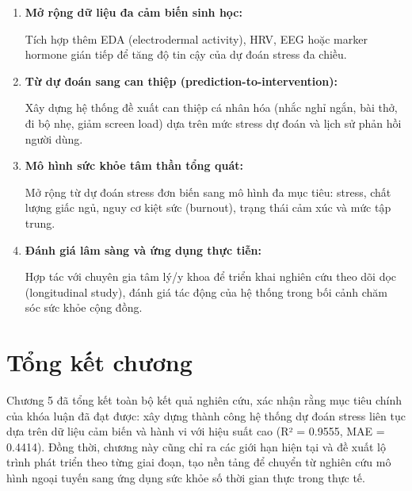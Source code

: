 \begin{enumerate}
    \item \textbf{Mở rộng dữ liệu đa cảm biến sinh học:}
    
    Tích hợp thêm EDA (electrodermal activity), HRV, EEG hoặc marker hormone gián tiếp để tăng độ tin cậy của dự đoán stress đa chiều.

    \item \textbf{Từ dự đoán sang can thiệp (prediction-to-intervention):}
    
    Xây dựng hệ thống đề xuất can thiệp cá nhân hóa (nhắc nghỉ ngắn, bài thở, đi bộ nhẹ, giảm screen load) dựa trên mức stress dự đoán và lịch sử phản hồi người dùng.

    \item \textbf{Mô hình sức khỏe tâm thần tổng quát:}
    
    Mở rộng từ dự đoán stress đơn biến sang mô hình đa mục tiêu: stress, chất lượng giấc ngủ, nguy cơ kiệt sức (burnout), trạng thái cảm xúc và mức tập trung.

    \item \textbf{Đánh giá lâm sàng và ứng dụng thực tiễn:}
    
    Hợp tác với chuyên gia tâm lý/y khoa để triển khai nghiên cứu theo dõi dọc (longitudinal study), đánh giá tác động của hệ thống trong bối cảnh chăm sóc sức khỏe cộng đồng.
\end{enumerate}

\section{Tổng kết chương}
\label{sec:chapter5_summary}

Chương 5 đã tổng kết toàn bộ kết quả nghiên cứu, xác nhận rằng mục tiêu chính của khóa luận đã đạt được: xây dựng thành công hệ thống dự đoán stress liên tục dựa trên dữ liệu cảm biến và hành vi với hiệu suất cao (R² = 0.9555, MAE = 0.4414). Đồng thời, chương này cũng chỉ ra các giới hạn hiện tại và đề xuất lộ trình phát triển theo từng giai đoạn, tạo nền tảng để chuyển từ nghiên cứu mô hình ngoại tuyến sang ứng dụng sức khỏe số thời gian thực trong thực tế.